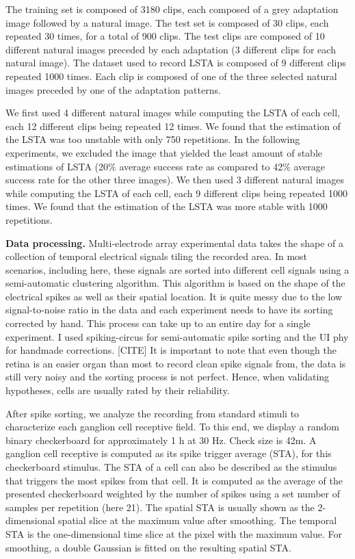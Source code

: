 The training set is composed of 3180 clips, each composed of a grey
adaptation image followed by a natural image. The test set is composed of 30
clips, each repeated 30 times, for a total of 900 clips.
The test clips are composed of 10 different natural
images preceded by each adaptation (3 different clips for each natural image).
The dataset used to record LSTA is composed of 9 different clips repeated 1000
times. Each clip is composed of one of the three selected natural images
preceded by one of the adaptation patterns.

We first used 4 different natural images while computing the LSTA of each cell,
each 12 different clips being repeated 12 times. We found that the estimation
of the LSTA was too unstable with only 750 repetitions. In the following
experiments, we excluded the image that yielded the least amount of stable
estimations of LSTA (20\% average success rate as compared to 42\% average
success rate for the other three images). We then used 3 different natural
images while computing the LSTA of each cell, each 9 different clips being
repeated 1000 times. We found that the estimation of the LSTA was more stable
with 1000 repetitions.

\textbf{Data processing.}
Multi-electrode array experimental data takes the shape of a collection of
temporal electrical signals tiling the recorded area.
In most scenarios, including here, these signals are sorted into different cell
signals using a semi-automatic clustering algorithm. This algorithm is based on
the shape
of the electrical spikes as well as their spatial location. It is
quite messy due to the low signal-to-noise ratio in the data and each
experiment needs to have its sorting corrected by hand.
This process can take up to an
entire day for a single experiment. I used spiking-circus for semi-automatic
spike sorting and the UI phy for handmade corrections. [CITE]
It is important to note that even though the retina is an easier organ than
most to record clean spike signals from, the data is still very noisy and the
sorting process is not perfect. Hence, when validating hypotheses, cells are
usually rated by their reliability.

After spike sorting, we analyze the recording from standard stimuli to
characterize each
ganglion cell receptive field. To this end, we display a random binary
checkerboard for approximately 1 h at 30 Hz. Check size is 42\textmu m. A
ganglion cell receptive is computed as its spike trigger average (STA), for
this checkerboard stimulus. The STA of a cell can also be described as the
stimulus that triggers the most spikes from that cell. It is computed as the
average of the presented checkerboard weighted by the number of spikes using a
set number of samples per repetition (here 21). The spatial STA is usually
shown as the 2-dimensional spatial slice at the maximum value after smoothing.
The temporal STA is the one-dimensional time slice at the pixel with the maximum
value. For smoothing, a double Gaussian is fitted on the resulting spatial
STA.

